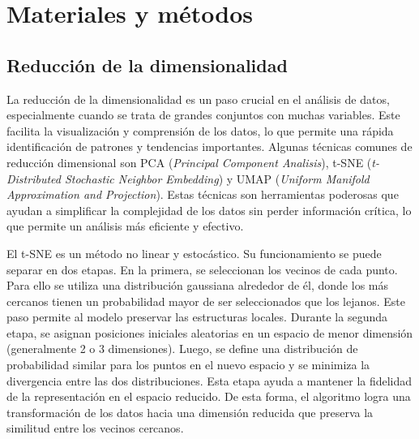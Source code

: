 \chapter{Materiales y métodos}
\label{cap1}
\section{Reducción de la dimensionalidad}
\label{c11}
\onehalfspacing


La reducción de la dimensionalidad es un paso crucial en el análisis de datos, especialmente cuando se trata de grandes conjuntos con muchas variables. Este facilita la visualización y comprensión de los datos, lo que permite una rápida identificación de patrones y tendencias importantes. Algunas técnicas comunes de reducción dimensional son PCA (\textit{Principal Component Analisis}), t-SNE (\textit{t-Distributed Stochastic Neighbor Embedding}) y UMAP (\textit{Uniform Manifold Approximation and Projection}). Estas técnicas son herramientas poderosas que ayudan a simplificar la complejidad de los datos sin perder información crítica, lo que permite un análisis más eficiente y efectivo.

El t-SNE es un método no linear y estocástico. Su funcionamiento se puede separar en dos etapas. En la primera, se seleccionan los vecinos de cada punto. Para ello se utiliza una distribución gaussiana alrededor de él, donde los más cercanos tienen un probabilidad mayor de ser seleccionados que los lejanos. Este paso permite al modelo preservar las estructuras locales. Durante la segunda etapa, se asignan posiciones iniciales aleatorias en un espacio de menor dimensión (generalmente 2 o 3 dimensiones). Luego, se define una distribución de probabilidad similar para los puntos en el nuevo espacio y se minimiza la divergencia entre las dos distribuciones. Esta etapa ayuda a mantener la fidelidad de la representación en el espacio reducido. De esta forma, el algoritmo logra una transformación de los datos hacia una dimensión reducida que preserva la similitud entre los vecinos cercanos.

